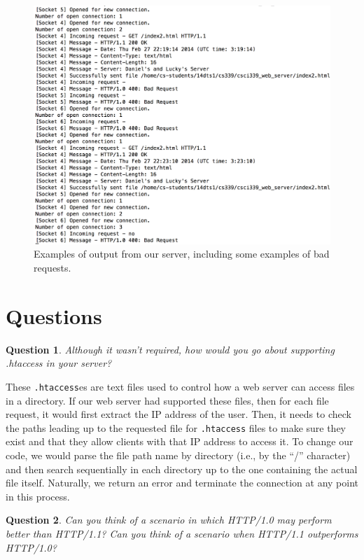 \documentclass[letterpaper,11pt,twocolumn]{article}
\newtheorem{que}{Question}
\begin{document}
\begin{figure}[t]
  \centering
   \includegraphics[width=\columnwidth]{example3.png}     
  \caption{Examples of output from our server, including some examples of bad requests.\label{output}}
\end{figure} 


\section{Questions}\label{questions}

\begin{que}
Although it wasn't required, how would you go about supporting .htaccess in your server? 
\end{que}

These \texttt{.htaccess}es are text files used to control how a web server can access files in a directory. If our web server had supported these
files, then for each file request, it would first extract the IP address of the user. Then, it needs to check the paths leading up to the requested
file for \texttt{.htaccess} files to make sure they exist and that they allow clients with that IP address to access it. To change our code, we would
parse the file path name by directory (i.e., by the ``/'' character) and then search sequentially in each directory up to the one containing the
actual file itself. Naturally, we return an error and terminate the connection at any point in this process.

\begin{que}
Can you think of a scenario in which HTTP/1.0 may perform better than HTTP/1.1? Can you think of a scenario when HTTP/1.1 outperforms HTTP/1.0?
\end{que}
\end{document}
